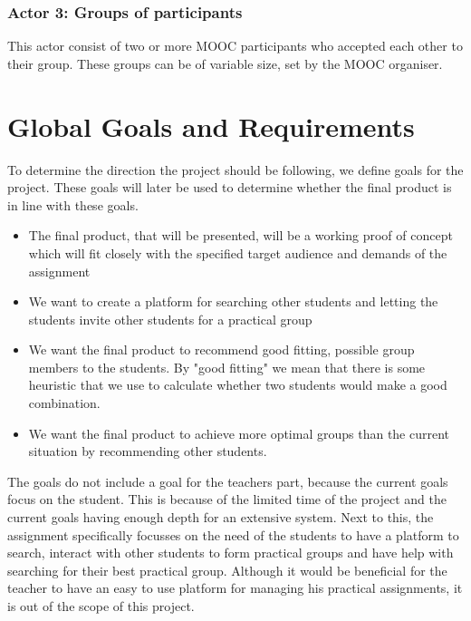 \subsubsection{Actor 3: Groups of participants}
This actor consist of two or more MOOC participants who accepted each other to their group.
These groups can be of variable size, set by the MOOC organiser.

\section{Global Goals and Requirements}
To determine the direction the project should be following, we define goals for the project.
These goals will later be used to determine whether the final product is in line with these goals.
\begin{itemize}
\item The final product, that will be presented, will be a working proof of concept which will fit closely with the specified target audience and demands of the assignment
\item We want to create a platform for searching other students and letting the students invite other students for a practical group
\item We want the final product to recommend good fitting, possible group members to the students. By "good fitting" we mean that there is some heuristic that we use to calculate whether two students would make a good combination.
\item We want the final product to achieve more optimal groups than the current situation by recommending other students.
\end{itemize}

The goals do not include a goal for the teachers part, because the current goals focus on the student.
This is because of the limited time of the project and the current goals having enough depth for an extensive system.
Next to this, the assignment specifically focusses on the need of the students to have a platform to search, interact with other students to form practical groups and have help with searching for their best practical group.
Although it would be beneficial for the teacher to have an easy to use platform for managing his practical assignments, it is out of the scope of this project.

